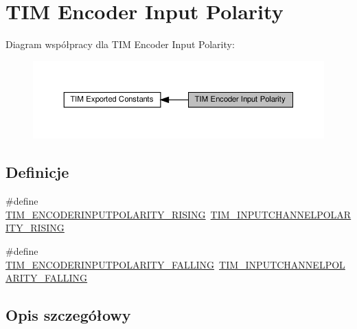\hypertarget{group___t_i_m___encoder___input___polarity}{}\section{T\+IM Encoder Input Polarity}
\label{group___t_i_m___encoder___input___polarity}
Diagram współpracy dla T\+IM Encoder Input Polarity\+:\nopagebreak
\begin{figure}[H]
\begin{center}
\leavevmode
\includegraphics[width=350pt]{group___t_i_m___encoder___input___polarity}
\end{center}
\end{figure}
\subsection*{Definicje}
\begin{DoxyCompactItemize}
\item 
\#define \hyperlink{group___t_i_m___encoder___input___polarity_gac015dd6602fcaa8dec8208e773f5921c}{T\+I\+M\+\_\+\+E\+N\+C\+O\+D\+E\+R\+I\+N\+P\+U\+T\+P\+O\+L\+A\+R\+I\+T\+Y\+\_\+\+R\+I\+S\+I\+NG}~\hyperlink{group___t_i_m___input___channel___polarity_ga4f4cede88a4ad4b33e81f2567e9bb08f}{T\+I\+M\+\_\+\+I\+N\+P\+U\+T\+C\+H\+A\+N\+N\+E\+L\+P\+O\+L\+A\+R\+I\+T\+Y\+\_\+\+R\+I\+S\+I\+NG}
\item 
\#define \hyperlink{group___t_i_m___encoder___input___polarity_gaf0e5158977c8d2fab26ff6dcdbc84ae6}{T\+I\+M\+\_\+\+E\+N\+C\+O\+D\+E\+R\+I\+N\+P\+U\+T\+P\+O\+L\+A\+R\+I\+T\+Y\+\_\+\+F\+A\+L\+L\+I\+NG}~\hyperlink{group___t_i_m___input___channel___polarity_ga07441a8c0a52234e30f471c23803450c}{T\+I\+M\+\_\+\+I\+N\+P\+U\+T\+C\+H\+A\+N\+N\+E\+L\+P\+O\+L\+A\+R\+I\+T\+Y\+\_\+\+F\+A\+L\+L\+I\+NG}
\end{DoxyCompactItemize}


\subsection{Opis szczegółowy}


